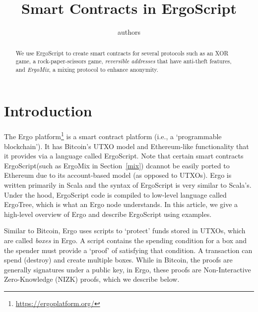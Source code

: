 \documentclass[11pt]{article}
\newcommand{\langname}{ErgoScript\xspace}
\newcommand{\mixname}{ErgoMix\xspace}
\begin{document}
\title{Smart Contracts in \langname}


\author{authors}


\maketitle


\begin{abstract}
We use \langname to create smart contracts for several protocols such as an XOR game, a rock-paper-scissors game, {\em reversible addresses} that have anti-theft features, and {\em \mixname}, a mixing protocol to enhance anonymity. 

\end{abstract}


\section{Introduction}

The Ergo platform\footnote{\url{https://ergoplatform.org/}} is a smart contract platform (i.e., a `programmable blockchain'). It has Bitcoin's UTXO model and Ethereum-like functionality that it provides via a language called \langname. Note that certain smart contracts \langname  (such as \mixname in Section~\ref{mix}) dcannot be easily ported to Ethereum due to its account-based model (as opposed to UTXOs). Ergo is written primarily in Scala and the syntax of \langname is very similar to Scala's. Under the hood, \langname code is compiled to low-level language called ErgoTree, which is what an Ergo node understands. In this article, we give a high-level overview of Ergo and describe \langname using examples.

Similar to Bitcoin, Ergo uses scripts to `protect' funds stored in UTXOs, which are called {\em boxes} in Ergo. A script contains the spending condition for a box and the spender must provide a `proof' of satisfying that condition. A transaction can spend (destroy) and create multiple boxes. While in Bitcoin, the proofs are generally signatures under a public key, in Ergo, these proofs are Non-Interactive Zero-Knowledge (NIZK) proofs, which we describe below.
\end{document}
